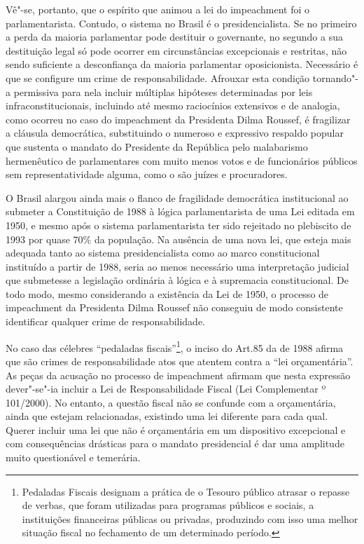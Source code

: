 Vê"-se, portanto, que o espírito que animou a lei do impeachment foi o
parlamentarista. Contudo, o sistema no Brasil é o presidencialista. Se
no primeiro a perda da maioria parlamentar pode destituir o governante,
no segundo a sua destituição legal só pode ocorrer em circunstâncias
excepcionais e restritas, não sendo suficiente a desconfiança da maioria
parlamentar oposicionista. Necessário é que se configure um crime de
responsabilidade. Afrouxar esta condição tornando"-a permissiva para nela
incluir múltiplas hipóteses determinadas por leis infraconstitucionais,
incluindo até mesmo raciocínios extensivos e de analogia, como ocorreu
no caso do impeachment da Presidenta Dilma Roussef, é fragilizar a
cláusula democrática, substituindo o numeroso e expressivo respaldo
popular que sustenta o mandato do Presidente da República pelo
malabarismo hermenêutico de parlamentares com muito menos votos e de
funcionários públicos sem representatividade alguma, como o são juízes e
procuradores.

O Brasil alargou ainda mais o flanco de fragilidade democrática
institucional ao submeter a Constituição de 1988 à lógica
parlamentarista de uma Lei editada em 1950, e mesmo após o sistema
parlamentarista ter sido rejeitado no plebiscito de 1993 por quase 70\%
da população. Na ausência de uma nova lei, que esteja mais adequada
tanto ao sistema presidencialista como ao marco constitucional
instituído a partir de 1988, seria ao menos necessário uma interpretação
judicial que submetesse a legislação ordinária à lógica e à supremacia
constitucional. De todo modo, mesmo considerando a existência da Lei de
1950, o processo de impeachment da Presidenta Dilma Roussef não
conseguiu de modo consistente identificar qualquer crime de
responsabilidade.

No caso das célebres ``pedaladas fiscais''\footnote{Pedaladas Fiscais
  designam a prática de o Tesouro público atrasar o repasse de verbas,
  que foram utilizadas para programas públicos e sociais, a instituições
  financeiras públicas ou privadas, produzindo com isso uma melhor
  situação fiscal no fechamento de um determinado período.}, o inciso 
do Art.85 da  de 1988 afirma que são crimes de responsabilidade atos
que atentem contra a ``lei orçamentária''. As peças da acusação no
processo de impeachment afirmam que nesta expressão dever"-se"-ia incluir
a Lei de Responsabilidade Fiscal (Lei Complementar º 101/2000). No
entanto, a questão fiscal não se confunde com a orçamentária, ainda que
estejam relacionadas, existindo uma lei diferente para cada qual. Querer
incluir uma lei que não é orçamentária em um dispositivo excepcional e
com consequências drásticas para o mandato presidencial é dar uma
amplitude muito questionável e temerária.

